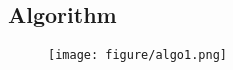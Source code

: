 \subsection{Algorithm}
\label{ap:algorithm}
\begin{figure}[h]
    \centering
    \texttt{[image: figure/algo1.png]}
    \label{alg:1}
\end{figure}

 

    



